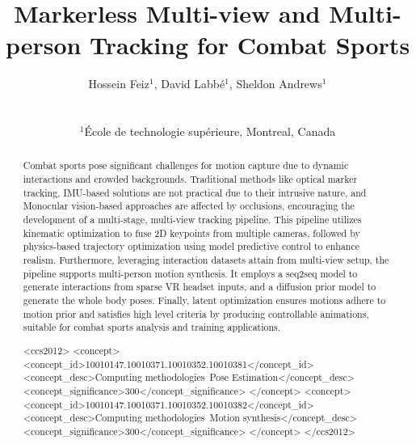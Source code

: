\documentclass{egpubl}
\title{Markerless Multi-view and Multi-person Tracking for Combat Sports}
\author[Hossein, Labbé, and Andrews]
{\parbox{\textwidth}{\centering 
        Hossein Feiz$^1$, David Labbé$^1$, Sheldon Andrews$^1$
        }
        \\
{\parbox{\textwidth}{\centering 
        $^1$École de technologie supérieure, Montreal, Canada
       }
}
}
\begin{document}

\maketitle

\begin{abstract}
   Combat sports pose significant challenges for motion capture due to dynamic interactions and crowded backgrounds. Traditional methods like optical marker tracking, IMU-based solutions are not practical due to their intrusive nature, and Monocular vision-based approaches are affected by occlusions, encouraging the development of a multi-stage, multi-view tracking pipeline. This pipeline utilizes kinematic optimization to fuse 2D keypoints from multiple cameras, followed by physics-based trajectory optimization using model predictive control to enhance realism.
   Furthermore, leveraging interaction datasets attain from multi-view setup, the pipeline supports multi-person motion synthesis. It employs a seq2seq model to generate interactions from sparse VR headset inputs, and a diffusion prior model to generate the whole body poses. Finally, latent optimization ensures motions adhere to motion prior and satisfies high level criteria by producing controllable animations, suitable for combat sports analysis and training applications.

\begin{CCSXML}
<ccs2012>
<concept>
<concept_id>10010147.10010371.10010352.10010381</concept_id>
<concept_desc>Computing methodologies~Pose Estimation</concept_desc>
<concept_significance>300</concept_significance>
</concept>
<concept>
<concept_id>10010147.10010371.10010352.10010382</concept_id>
<concept_desc>Computing methodologies~Motion synthesis</concept_desc>
<concept_significance>300</concept_significance>
</concept>
</ccs2012>
\end{CCSXML}



\printccsdesc   
\end{abstract}  
\end{document}
